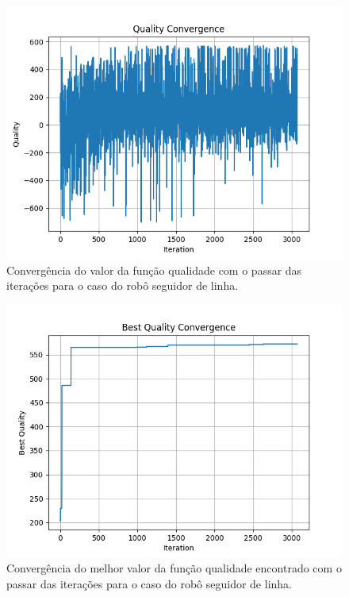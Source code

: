 \documentclass[conference]{IEEEtran}
\begin{document}
\begin{figure}[htbp]
\centering
\centerline{\includegraphics[scale=0.4]{line_quality_convergence.png}}
\caption{Convergência do valor da função qualidade com o passar das iterações para o caso do robô seguidor de linha.}
\label{line_quality_convergence}
\end{figure}

\begin{figure}[htbp]
\centering
\centerline{\includegraphics[scale=0.4]{line_best_convergence.png}}
\caption{Convergência do melhor valor da função qualidade encontrado com o passar das iterações para o caso do robô seguidor de linha.}
\label{line_best_convergence}
\end{figure}
\end{document}
